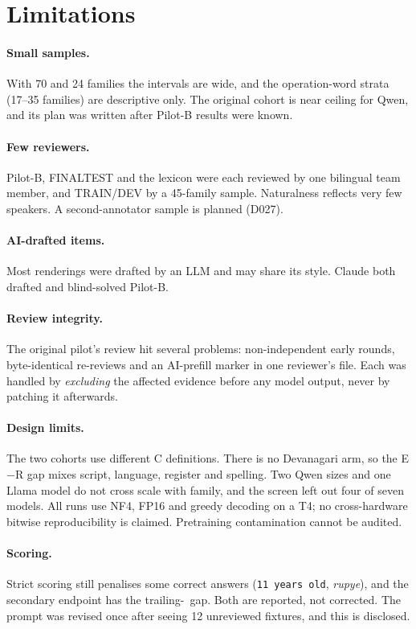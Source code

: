 \documentclass[12pt,a4paper,oneside]{report}
\renewcommand{\_}{\oldunderscore\allowbreak}
\newcommand{\rs}{\rupee}
\begin{document}
\section{Limitations}

\paragraph{Small samples.} With 70 and 24 families the intervals are wide, and the operation-word strata (17--35 families) are descriptive only. The original cohort is near ceiling for Qwen, and its plan was written after Pilot-B results were known.

\paragraph{Few reviewers.} Pilot-B, FINAL\_TEST and the lexicon were each reviewed by one bilingual team member, and TRAIN/DEV by a 45-family sample. Naturalness reflects very few speakers. A second-annotator sample is planned (D027).

\paragraph{AI-drafted items.} Most renderings were drafted by an LLM and may share its style. Claude both drafted and blind-solved Pilot-B.

\paragraph{Review integrity.} The original pilot's review hit several problems: non-independent early rounds, byte-identical re-reviews and an AI-prefill marker in one reviewer's file. Each was handled by \emph{excluding} the affected evidence before any model output, never by patching it afterwards.

\paragraph{Design limits.} The two cohorts use different C definitions. There is no Devanagari arm, so the E$-$R gap mixes script, language, register and spelling. Two Qwen sizes and one Llama model do not cross scale with family, and the screen left out four of seven models. All runs use NF4, FP16 and greedy decoding on a T4; no cross-hardware bitwise reproducibility is claimed. Pretraining contamination cannot be audited.

\paragraph{Scoring.} Strict scoring still penalises some correct answers (\texttt{11 years old}, \emph{rupye}), and the secondary endpoint has the trailing-\rs\ gap. Both are reported, not corrected. The prompt was revised once after seeing 12 unreviewed fixtures, and this is disclosed.
\end{document}
